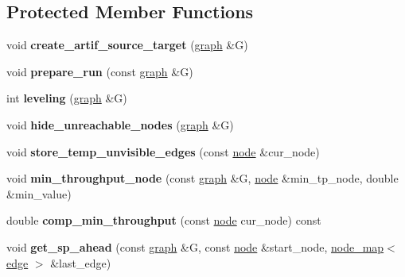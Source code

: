 \subsection*{Protected Member Functions}
\begin{DoxyCompactItemize}
\item 
\mbox{\label{classmaxflow__pp_a02438e89291eeccda0b247d20ffa11e5}} 
void {\bfseries create\+\_\+artif\+\_\+source\+\_\+target} (\mbox{\hyperlink{classgraph}{graph}} \&G)
\item 
\mbox{\label{classmaxflow__pp_a7a738741f8050df0cb0be0381aef0825}} 
void {\bfseries prepare\+\_\+run} (const \mbox{\hyperlink{classgraph}{graph}} \&G)
\item 
\mbox{\label{classmaxflow__pp_adefb2cdc0145d57efd2d93c17a180896}} 
int {\bfseries leveling} (\mbox{\hyperlink{classgraph}{graph}} \&G)
\item 
\mbox{\label{classmaxflow__pp_a93bb037fd3fc83c6558b560fc4da2340}} 
void {\bfseries hide\+\_\+unreachable\+\_\+nodes} (\mbox{\hyperlink{classgraph}{graph}} \&G)
\item 
\mbox{\label{classmaxflow__pp_abb23812a3e8bca1955b835d3c41836e1}} 
void {\bfseries store\+\_\+temp\+\_\+unvisible\+\_\+edges} (const \mbox{\hyperlink{classnode}{node}} \&cur\+\_\+node)
\item 
\mbox{\label{classmaxflow__pp_a9f820f51329f0e0ec4d8123547ae6ebd}} 
void {\bfseries min\+\_\+throughput\+\_\+node} (const \mbox{\hyperlink{classgraph}{graph}} \&G, \mbox{\hyperlink{classnode}{node}} \&min\+\_\+tp\+\_\+node, double \&min\+\_\+value)
\item 
\mbox{\label{classmaxflow__pp_ab1146e40ae2f2405e0ca6ea3ff43a6ff}} 
double {\bfseries comp\+\_\+min\+\_\+throughput} (const \mbox{\hyperlink{classnode}{node}} cur\+\_\+node) const
\item 
\mbox{\label{classmaxflow__pp_a340e4b9909a44ed7003760017c761e3b}} 
void {\bfseries get\+\_\+sp\+\_\+ahead} (const \mbox{\hyperlink{classgraph}{graph}} \&G, const \mbox{\hyperlink{classnode}{node}} \&start\+\_\+node, \mbox{\hyperlink{classnode__map}{node\+\_\+map}}$<$ \mbox{\hyperlink{classedge}{edge}} $>$ \&last\+\_\+edge)

\end{DoxyCompactItemize}
